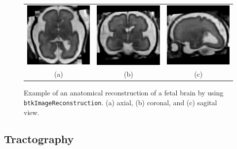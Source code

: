 \begin{figure}[t]
\centering
\begin{tabular}{ccc}
\includegraphics[width=0.3\columnwidth]{hr_axl.eps}&
\includegraphics[width=0.3\columnwidth]{hr_cor.eps}&
\includegraphics[width=0.3\columnwidth]{hr_sag.eps}\\
{(a)}&{(b)}&{(c)}\\
\end{tabular}
\caption{Example of an anatomical reconstruction of a fetal brain by using
\texttt{btkImageReconstruction}. (a) axial, (b) coronal, and (c) sagital view.}
\label{fig:reconstruction}
\end{figure}


\subsection{Tractography}

